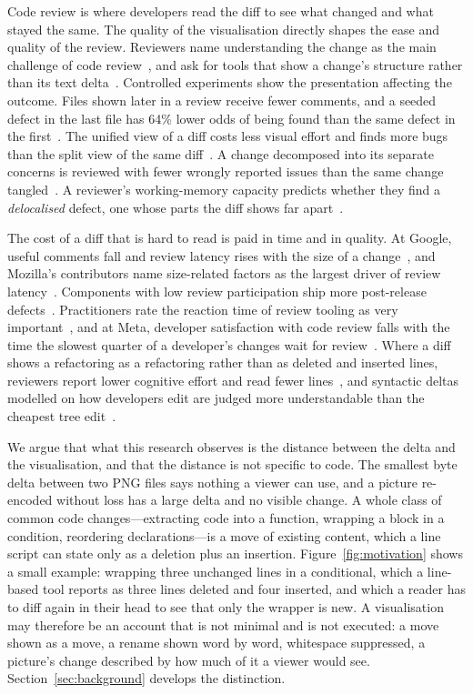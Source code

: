 \documentclass[sigconf,review]{acmart}
\begin{document}
Code review is where developers read the diff to see what changed and what stayed the same. The
quality of the visualisation directly shapes the ease and quality of the review. Reviewers name understanding the change as the main challenge of code
review~\cite{bacchelli-bird-2013}, and ask for tools that show a change's structure rather than
its text delta~\cite{tao-2012}. Controlled experiments show the presentation affecting the
outcome. Files shown later in a review receive fewer comments, and a seeded defect in the last
file has 64\% lower odds of being found than the same defect in the
first~\cite{fregnan-2022,rahman-2026}. The unified view of a diff costs less visual effort and
finds more bugs than the split view of the same diff~\cite{alcocer-2023}. A change decomposed
into its separate concerns is reviewed with fewer wrongly reported issues than the same change
tangled~\cite{herzig-2013,barnett-2015,dibiase-2019}. A reviewer's working-memory capacity
predicts whether they find a \emph{delocalised} defect, one whose parts the diff shows far
apart~\cite{baum-2019,goncalves-2022}.

The cost of a diff that is hard to read is paid in time and in quality. At Google, useful
comments fall and review latency rises with the size of a change~\cite{sadowski-2018}, and
Mozilla's contributors name size-related factors as the largest driver of review
latency~\cite{kononenko-2016}. Components with low review participation ship more post-release
defects~\cite{mcintosh-2016}. Practitioners rate the reaction time of review tooling as very
important~\cite{kudrjavets-2023}, and at Meta, developer satisfaction with code review
falls with the time the slowest quarter of a developer's changes wait for
review~\cite{meta-review-time-2022}. Where a diff shows a refactoring as a refactoring rather
than as deleted and inserted lines, reviewers report lower cognitive effort and read fewer
lines~\cite{ge-2017,brito-2021}, and syntactic deltas modelled on how developers edit are judged
more understandable than the cheapest tree edit~\cite{decker-2020}.

We argue that what this research observes is the distance between the delta and the
visualisation, and that the distance is not specific to code. The smallest byte delta between two PNG files says nothing a viewer can use, and a picture
re-encoded without loss has a large delta and no visible change. A whole class of common code changes—extracting
code into a function, wrapping a block in a condition, reordering declarations—is a move of
existing content, which a line script can state only as a deletion plus an insertion.
Figure~\ref{fig:motivation} shows a small example: wrapping three unchanged lines in a
conditional, which a line-based tool reports as three lines deleted and four inserted, and which a
reader has to diff again in their head to see that only the wrapper is new. A visualisation may
therefore be an account that is not minimal and is not executed: a move shown as a move, a
rename shown word by word, whitespace suppressed, a picture's change described by how much of it
a viewer would see. Section~\ref{sec:background} develops the distinction.
\end{document}
